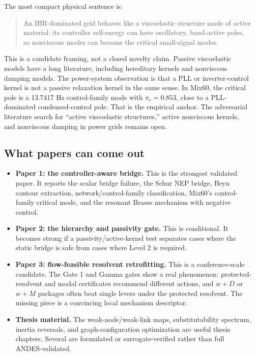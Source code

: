 \documentclass[11pt]{article}
\begin{document}
The most compact physical sentence is:

\begin{quote}
An IBR-dominated grid behaves like a viscoelastic structure made of active
material: its controller self-energy can have oscillatory, band-active poles,
so nonviscous modes can become the critical small-signal modes.
\end{quote}

This is a candidate framing, not a closed novelty claim. Passive viscoelastic
models have a long literature, including hereditary kernels and nonviscous
damping models. The power-system observation is that a PLL or inverter-control
kernel is not a passive relaxation kernel in the same sense. In Mix60, the
critical pole is a 13.7417 Hz control-family mode with $\pi_c=0.853$, close to
a PLL-dominated condensed-control pole. That is the empirical anchor. The
adversarial literature search for ``active viscoelastic structures,'' active
nonviscous kernels, and nonviscous damping in power grids remains open.

\subsection{What papers can come out}

\begin{itemize}[leftmargin=*]
\item \textbf{Paper 1: the controller-aware bridge.} This is the strongest
validated paper. It reports the scalar bridge failure, the Schur NEP bridge,
Beyn contour extraction, network/control-family classification, Mix60's
control-family critical mode, and the resonant Braess mechanism with negative
control.
\item \textbf{Paper 2: the hierarchy and passivity gate.} This is conditional.
It becomes strong if a passivity/active-kernel test separates cases where the
static bridge is safe from cases where Level 2 is required.
\item \textbf{Paper 3: flow-feasible resolvent retrofitting.} This is a
conference-scale candidate. The Gate 1 and Gamma gates show a real phenomenon:
protected-resolvent and modal certificates recommend different actions, and
$w+D$ or $w+M$ packages often beat single levers under the protected resolvent.
The missing piece is a convincing local mechanism descriptor.
\item \textbf{Thesis material.} The weak-node/weak-link maps, substitutability
spectrum, inertia reversals, and graph-configuration optimization are useful
thesis chapters. Several are formulated or surrogate-verified rather than full
ANDES-validated.
\end{itemize}
\end{document}
